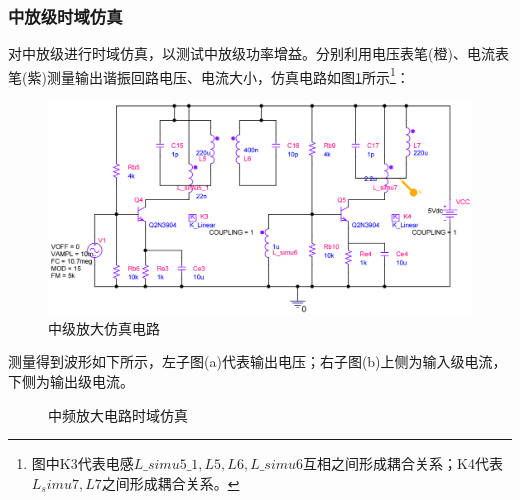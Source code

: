 \documentclass[a4paper,12pt,twoside]{article}
\begin{document}
\subsubsection{中放级时域仿真}
对中放级进行时域仿真，以测试中放级功率增益。分别利用电压表笔(橙)、电流表笔(紫)测量输出谐振回路电压、电流大小，仿真电路如图\ref{中放仿真}所示\footnote{图中K3代表电感$L\_simu5\_1,L5,L6,L\_simu6$互相之间形成耦合关系；K4代表$L_simu7,L7$之间形成耦合关系。}：
\begin{figure}[H]
    \centering
    \includegraphics[scale=0.2]{中放仿真.png}
    \caption{中级放大仿真电路}
    \label{中放仿真}
\end{figure}
测量得到波形如下所示，左子图(a)代表输出电压；右子图(b)上侧为输入级电流，下侧为输出级电流。
\begin{figure}[H]
    \centering
     \hspace{0.01\linewidth}
    \caption{中频放大电路时域仿真}
  \label{中放_wave}
\end{figure}
\end{document}
